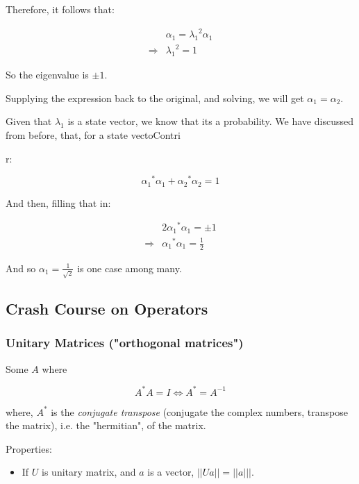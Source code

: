 \documentclass[letterpaper]{article}
\begin{document}
Therefore, it follows that:

\begin{align}
   &\alpha_1 = {\lambda_1}^2 \alpha_1 \\
   \Rightarrow &{\lambda_1}^2 = 1
\end{align}

So the eigenvalue is \(\pm 1\).

Supplying the expression back to the original, and solving, we will get \(\alpha_1 = \alpha_2\).

Given that \(\lambda_1\) is a state vector, we know that its a probability. We have discussed from before, that, for a state vectoContri

r:

\begin{equation}
   {\alpha_1}^*\alpha_1 + {\alpha_2}^*\alpha_2 = 1
\end{equation}

And then, filling that in:

\begin{align}
   &2{\alpha_1}^* \alpha_1 = \pm 1 \\
\Rightarrow &{\alpha_1}^* \alpha_1 = \frac{1}{2}
\end{align}

And so \(\alpha_1 = \frac{1}{\sqrt{2}}\) is one case among many.

\subsection{Crash Course on Operators}
\label{sec:orgefe41e7}

\subsubsection{Unitary Matrices ("orthogonal matrices")}
\label{sec:orgd54fa0b}
Some \(A\) where

\begin{equation}
   A^*A = I \Leftrightarrow A^* = A^{-1}
\end{equation}

where, \(A^*\) is the \emph{conjugate transpose} (conjugate the complex numbers, transpose the matrix), i.e. the "hermitian", of the matrix.

Properties:

\begin{itemize}
\item If \(U\) is unitary matrix, and \(a\) is a vector, \(||Ua|| = ||a|||\).
\end{itemize}
\end{document}
